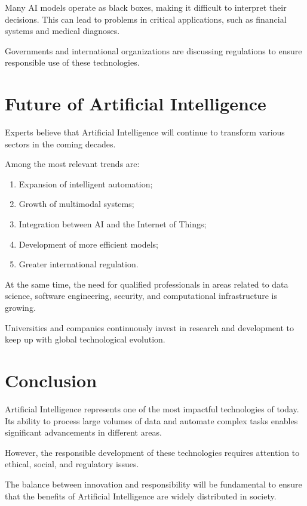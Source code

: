 \documentclass[11pt]{article}
\begin{document}
Many AI models operate as black boxes, making it difficult to interpret their decisions.
This can lead to problems in critical applications, such as financial systems and medical
diagnoses.

Governments and international organizations are discussing regulations to ensure responsible
use of these technologies. 

\section{Future of Artificial Intelligence}

Experts believe that Artificial Intelligence will continue to transform various sectors
in the coming decades.

Among the most relevant trends are:

\begin{enumerate}
    \item Expansion of intelligent automation;
    \item Growth of multimodal systems;
    \item Integration between AI and the Internet of Things;
    \item Development of more efficient models;
    \item Greater international regulation.
\end{enumerate}

At the same time, the need for qualified professionals in areas related to
data science, software engineering, security, and computational infrastructure is growing.

Universities and companies continuously invest in research and development to
keep up with global technological evolution. 

\section{Conclusion}

Artificial Intelligence represents one of the most impactful technologies of today. Its
ability to process large volumes of data and automate complex tasks enables
significant advancements in different areas.

However, the responsible development of these technologies requires attention to ethical,
social, and regulatory issues.

The balance between innovation and responsibility will be fundamental to ensure that the benefits
of Artificial Intelligence are widely distributed in society. 
\end{document}
